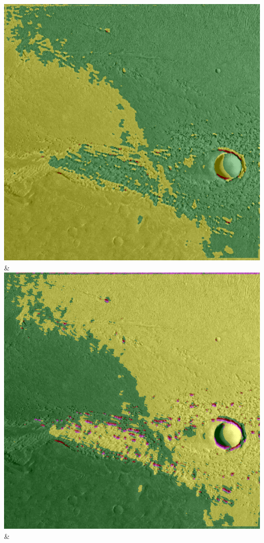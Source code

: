 \begin{table}[h!]
\begin{tabularx}{\textwidth}
		\includegraphics[width=0.9\linewidth]{images/gen/number_of_segments/p03_02.png_20.png} &
		\includegraphics[width=0.9\linewidth]{images/gen/number_of_segments/p03_02.png_50.png} &

\end{tabularx}
\end{table}
